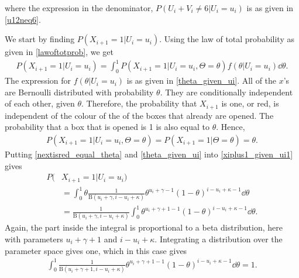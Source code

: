 where the expression in the denominator, $P(U_i+V_i\neq6|U_i=u_i)$ is as given in \eqref{u12neq6}. 

We start by finding $P(X_{i+1}=1|U_i=u_i)$. Using the law of total probability as given in \eqref{lawoftotprob}, we get
\begin{equation}
\label{xiplus1_given_ui1}
    \begin{aligned}
        P(X_{i+1}=1|U_i=u_i)
        = \int_0^1 P(X_{i+1}=1|U_i=u_i,\Theta=\theta)f(\theta|U_i=u_i) \dd \theta.
    \end{aligned}
\end{equation}
The expression for $f(\theta|U_i=u_i)$ is as given in \eqref{theta_given_ui}. All of the $x$'s are Bernoulli distributed with probability $\theta$. They are conditionally independent of each other, given $\theta$. Therefore, the probability that $X_{i+1}$ is one, or red, is independent of the colour of the of the boxes that already are opened. The probability that a box that is opened is 1 is also equal to $\theta$. Hence,
\begin{equation}
\label{nextisred_equal_theta}
    \begin{aligned}
        P(X_{i+1}=1|U_i=u_i,\Theta=\theta) = P(X_{i+1}=1|\Theta=\theta) = \theta.
    \end{aligned}
\end{equation}
Putting \eqref{nextisred_equal_theta} and \eqref{theta_given_ui} into \eqref{xiplus1_given_ui1} gives
\begin{equation}
\label{xiplus1_given_ui2}
    \begin{aligned}
        P(&X_{i+1}=1|U_i=u_i)\\
        &= \int_0^1 \theta \frac{1}{\text{B}(u_i+\gamma,i-u_i+\kappa)}\theta^{u_i+\gamma-1}(1-\theta)^{i-u_i+\kappa-1}  \dd \theta\\[6pt]
        &=\frac{1}{\text{B}(u_i+\gamma,i-u_i+\kappa)} \int_0^1 \theta^{u_i+\gamma+1-1}(1-\theta)^{i-u_i+\kappa-1} \dd \theta.
    \end{aligned}
\end{equation}
Again, the part inside the integral is proportional to a beta distribution, here with parameters $u_i+\gamma+1$ and $i-u_i+\kappa$. Integrating a distribution over the parameter space gives one, which in this case gives
\begin{equation*}
    \begin{aligned}
        \int_0^1 \frac{1}{\text{B}(u_i+\gamma+1,i-u_i+\kappa)} \theta^{u_i+\gamma+1-1}(1-\theta)^{i-u_i+\kappa-1}  \dd \theta = 1.
    \end{aligned}
\end{equation*}
